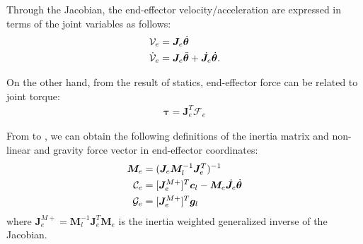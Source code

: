 Through the Jacobian,
the end-effector velocity/acceleration are expressed in terms of the joint variables as follows:
%
\begin{align}
  \mathcal{V}_{e} &= \bm{J}_{e}{\dot{\bm{\theta}}}\label{eq:VEL_EE}\\
  \dot{\mathcal{V}}_{e} &= \bm{J}_{e}{\ddot{\bm{\theta}}} + \dot{\bm{J}}_{e}{\dot{\bm{\theta}}}\label{eq:ACC_EE}.
\end{align}
%

On the other hand, from the result of statics,
end-effector force can be related to joint torque:
%
\begin{align}
  \bm{\tau} = \bm{J}_{e}^{T}\mathcal{F}_{e}\label{eq:STATICS}
\end{align}
%

From  to ,
we can obtain the following definitions of the inertia matrix and non-linear and
gravity force vector in end-effector coordinates:
%
\begin{align}
  \bm{M}_{e} &= (\bm{J}_{e}\bm{M}_{l}^{-1}\bm{J}_{e}^{T})^{-1}\\
  \mathcal{C}_{e} &= [\bm{J}_{e}^{M+}]{}^{T}\bm{c}_{l} - \bm{M}_{e}\dot{\bm{J}}_{e}{\dot{\bm{\theta}}}\\
  \mathcal{G}_{e} &= [\bm{J}_{e}^{M+}]{}^{T}\bm{g}_{l}
\end{align}
%
where $\bm{J}_{e}^{M+} = \bm{M}_{l}^{-1}\bm{J}_{e}^{T}\bm{M}_{e}$ is the inertia weighted
generalized inverse of the Jacobian.

